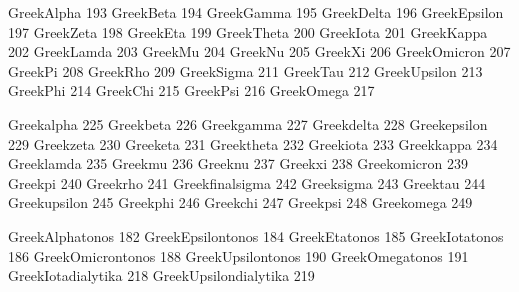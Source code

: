  GreekAlpha        193
 GreekBeta         194
 GreekGamma        195
 GreekDelta        196
 GreekEpsilon      197
 GreekZeta         198
 GreekEta          199
 GreekTheta        200
 GreekIota         201
 GreekKappa        202
 GreekLamda        203
 GreekMu           204
 GreekNu           205
 GreekXi           206
 GreekOmicron      207
 GreekPi           208
 GreekRho          209
 GreekSigma        211
 GreekTau          212
 GreekUpsilon      213
 GreekPhi          214
 GreekChi          215
 GreekPsi          216
 GreekOmega        217

%
%

 Greekalpha        225
 Greekbeta         226
 Greekgamma        227
 Greekdelta        228
 Greekepsilon      229
 Greekzeta         230
 Greeketa          231
 Greektheta        232
 Greekiota         233
 Greekkappa        234
 Greeklamda        235
 Greekmu           236
 Greeknu           237
 Greekxi           238
 Greekomicron      239
 Greekpi           240
 Greekrho          241
 Greekfinalsigma   242
 Greeksigma        243
 Greektau          244
 Greekupsilon      245
 Greekphi          246
 Greekchi          247
 Greekpsi          248
 Greekomega        249

%
%

 GreekAlphatonos        182
 GreekEpsilontonos      184
 GreekEtatonos          185
 GreekIotatonos         186
 GreekOmicrontonos      188
 GreekUpsilontonos      190
 GreekOmegatonos        191
 GreekIotadialytika     218
 GreekUpsilondialytika  219

%
%

